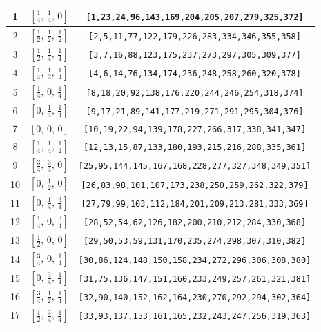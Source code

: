 \documentclass[fleqn,8pt]{jsarticle}
\begin{document}
\begin{longtable}{ccc}
1 & $\left[ \frac{1}{4},\, \frac{1}{4},\, 0 \right]$ & {\tt [1,23,24,96,143,169,204,205,207,279,325,372]} \\ \hline
2 & $\left[ \frac{1}{2},\, \frac{1}{2},\, \frac{1}{2} \right]$ & {\tt [2,5,11,77,122,179,226,283,334,346,355,358]} \\ \hline
3 & $\left[ \frac{1}{2},\, \frac{1}{4},\, \frac{1}{4} \right]$ & {\tt [3,7,16,88,123,175,237,273,297,305,309,377]} \\ \hline
4 & $\left[ \frac{1}{4},\, \frac{1}{2},\, \frac{1}{4} \right]$ & {\tt [4,6,14,76,134,174,236,248,258,260,320,378]} \\ \hline
5 & $\left[ \frac{1}{4},\, 0,\, \frac{1}{4} \right]$ & {\tt [8,18,20,92,138,176,220,244,246,254,318,374]} \\ \hline
6 & $\left[ 0,\, \frac{1}{4},\, \frac{1}{4} \right]$ & {\tt [9,17,21,89,141,177,219,271,291,295,304,376]} \\ \hline
7 & $\left[ 0,\, 0,\, 0 \right]$ & {\tt [10,19,22,94,139,178,227,266,317,338,341,347]} \\ \hline
8 & $\left[ \frac{1}{4},\, \frac{1}{4},\, \frac{1}{2} \right]$ & {\tt [12,13,15,87,133,180,193,215,216,288,335,361]} \\ \hline
9 & $\left[ \frac{3}{4},\, \frac{3}{4},\, 0 \right]$ & {\tt [25,95,144,145,167,168,228,277,327,348,349,351]} \\ \hline
10 & $\left[ 0,\, \frac{1}{2},\, 0 \right]$ & {\tt [26,83,98,101,107,173,238,250,259,262,322,379]} \\ \hline
11 & $\left[ 0,\, \frac{1}{4},\, \frac{3}{4} \right]$ & {\tt [27,79,99,103,112,184,201,209,213,281,333,369]} \\ \hline
12 & $\left[ \frac{1}{4},\, 0,\, \frac{3}{4} \right]$ & {\tt [28,52,54,62,126,182,200,210,212,284,330,368]} \\ \hline
13 & $\left[ \frac{1}{2},\, 0,\, 0 \right]$ & {\tt [29,50,53,59,131,170,235,274,298,307,310,382]} \\ \hline
14 & $\left[ \frac{3}{4},\, 0,\, \frac{1}{4} \right]$ & {\tt [30,86,124,148,150,158,234,272,296,306,308,380]} \\ \hline
15 & $\left[ 0,\, \frac{3}{4},\, \frac{1}{4} \right]$ & {\tt [31,75,136,147,151,160,233,249,257,261,321,381]} \\ \hline
16 & $\left[ \frac{3}{4},\, \frac{1}{2},\, \frac{1}{4} \right]$ & {\tt [32,90,140,152,162,164,230,270,292,294,302,364]} \\ \hline
17 & $\left[ \frac{1}{2},\, \frac{3}{4},\, \frac{1}{4} \right]$ & {\tt [33,93,137,153,161,165,232,243,247,256,319,363]} \\ \hline

\end{longtable}
\end{document}

